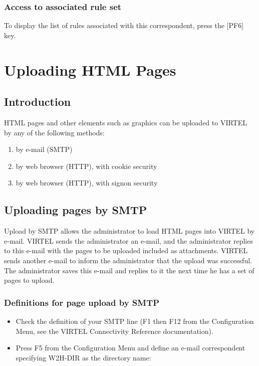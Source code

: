\documentclass[letterpaper,10pt,english]{sphinxmanual}
\begin{document}
\subsubsection{Access to associated rule set}
\label{\detokenize{User_Guide:access-to-associated-rule-set}}
To display the list of rules associated with this correspondent, press the {[}PF6{]} key.


\section{Uploading HTML Pages}
\label{\detokenize{User_Guide:v457ug-uploading-html-pages}}\label{\detokenize{User_Guide:uploading-html-pages}}

\subsection{Introduction}
\label{\detokenize{User_Guide:id4}}
HTML pages and other elements such as graphics can be uploaded to VIRTEL by any of the following methods:
\begin{enumerate}
\item {} 
by e-mail (SMTP)

\item {} 
by web browser (HTTP), with cookie security

\item {} 
by web browser (HTTP), with signon security

\end{enumerate}


\subsection{Uploading pages by SMTP}
\label{\detokenize{User_Guide:v457ug-http-uploading-pages-smtp}}\label{\detokenize{User_Guide:uploading-pages-by-smtp}}
Upload by SMTP allows the administrator to load HTML pages into VIRTEL by e-mail. VIRTEL sends the administrator an e-mail, and the administrator replies to this e-mail with the pages to be uploaded included as attachments. VIRTEL sends another e-mail to inform the administrator that the upload was successful. The administrator saves this e-mail and replies to it the next time he has a set of pages to upload.


\subsubsection{Definitions for page upload by SMTP}
\label{\detokenize{User_Guide:definitions-for-page-upload-by-smtp}}\begin{itemize}
\item {} 
Check the definition of your SMTP line (F1 then F12 from the Configuration Menu, see the VIRTEL Connectivity Reference documentation).

\item {} 
Press F5 from the Configuration Menu and define an e-mail correspondent specifying W2H-DIR as the directory name:

\end{itemize}
\end{document}
